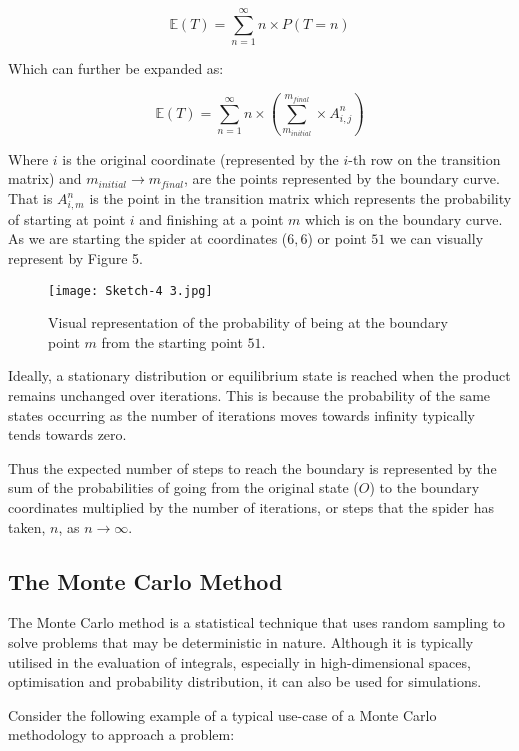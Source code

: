 \documentclass[12pt,a4paper]{article}
\begin{document}
\begin{equation*}
    \mathbb{E}(T) = \sum_{n=1}^{\infty} n \times P(T=n)
\end{equation*}

Which can further be expanded as:

\begin{equation}
    \mathbb{E}(T) = \sum_{n=1}^{\infty} n \times (\sum_{m_{initial}}^{m_{final}} \times A_{i, j}^n)
\end{equation}

Where $i$ is the original coordinate (represented by the $i$-th row on the transition matrix) and $m_{initial} \rightarrow m_{final}$, are the points represented by the boundary curve. That is $A_{i, m}^n$ is the point in the transition matrix which represents the probability of starting at point $i$ and finishing at a point $m$ which is on the boundary curve. As we are starting the spider at coordinates ($6, 6$) or point $51$ we can visually represent by Figure 5.

\begin{figure}[htbp]
    \centering
    \texttt{[image: Sketch-4 3.jpg]}
    \caption{Visual representation of the probability of being at the boundary point $m$ from the starting point $51$.}
    \label{fig:MSRC1}
\end{figure}

Ideally, a stationary distribution or equilibrium state is reached when the product remains unchanged over iterations. This is because the probability of the same states occurring as the number of iterations moves towards infinity typically tends towards zero.

Thus the expected number of steps to reach the boundary is represented by the sum of the probabilities of going from the original state ($O$) to the boundary coordinates multiplied by the number of iterations, or steps that the spider has taken, $n$, as $n \rightarrow \infty$. 

\subsection{The Monte Carlo Method}
The Monte Carlo method is a statistical technique that uses random sampling to solve problems that may be deterministic in nature.
Although it is typically utilised in the evaluation of integrals, especially in high-dimensional spaces, optimisation and probability distribution, it can also be used for simulations.

Consider the following example of a typical use-case of a Monte Carlo methodology to approach a problem:
\end{document}
